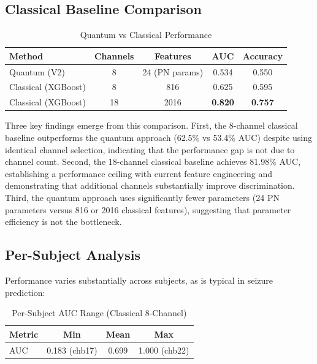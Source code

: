 \documentclass[pdflatex,sn-mathphys-num]{sn-jnl}
\begin{document}
\subsection{Classical Baseline Comparison}
\label{sec:comparison}

\begin{table}[htbp]
\centering
\caption{Quantum vs Classical Performance}
\label{tab:qvc}
\begin{tabular}{lcccc}
\toprule
Method & Channels & Features & AUC & Accuracy \\
\midrule
Quantum (V2) & 8 & 24 (PN params) & 0.534 & 0.550 \\
Classical (XGBoost) & 8 & 816 & 0.625 & 0.595 \\
Classical (XGBoost) & 18 & 2016 & \textbf{0.820} & \textbf{0.757} \\
\bottomrule
\end{tabular}
\end{table}

Three key findings emerge from this comparison. First, the 8-channel classical baseline outperforms the quantum approach (62.5\% vs 53.4\% AUC) despite using identical channel selection, indicating that the performance gap is not due to channel count. Second, the 18-channel classical baseline achieves 81.98\% AUC, establishing a performance ceiling with current feature engineering and demonstrating that additional channels substantially improve discrimination. Third, the quantum approach uses significantly fewer parameters (24 PN parameters versus 816 or 2016 classical features), suggesting that parameter efficiency is not the bottleneck.

\subsection{Per-Subject Analysis}
\label{sec:persubject}

Performance varies substantially across subjects, as is typical in seizure prediction:

\begin{table}[htbp]
\centering
\caption{Per-Subject AUC Range (Classical 8-Channel)}
\label{tab:persubject}
\begin{tabular}{lccc}
\toprule
Metric & Min & Mean & Max \\
\midrule
AUC & 0.183 (chb17) & 0.699 & 1.000 (chb22) \\
\bottomrule
\end{tabular}
\end{table}
\end{document}
